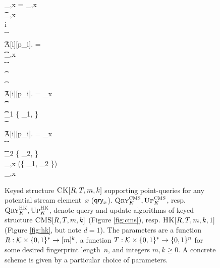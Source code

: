 \begin{figure}[htp]
{\begin{pcvstack}[boxed,center,space=0.5em]
\begin{pchstack}
\begin{pcvstack}[space=0.45em]
{						\pcif \cnt_{,x} =  \cnt_{,x}\label{line:UB=LB:start}\\
						\t \pcreturn \cnt_{,x} \label{line:UB=LB:finish}\\
						\pcfor i \in [k] \label{line:ck:startoverestdjust}\\
						\t {}\\
						\t \pcif A[i][p_i]. = \star\\
						\t \t \cnt_{,x} \\
						\t \t {} \label{line:ck:est0}\\
						\t {}\\
						\t {}\\
						\t \pcelse \pcif A[i][p_i]. \not= \fp_x\\
						\t \t \Theta \gets {}\\
						\t \t \Theta_1 {\gets} {\min}\left\{ \Theta_1, \Theta \right\}\\
						\t {}\\
						\t \pcelse \pcif A[i][p_i]. = \fp_x\\
						\t \t \Theta \gets {}\\
						\t \t \Theta_2 {\gets} 
						{\min}\left\{ 
						\Theta_2, \Theta\right\}\\
						\cnt_{,x} {\gets} \floor(\min\left\{ \Theta_1, \Theta_2 \right\}) \label{line:ck:finaloverest}\\
						\pcreturn \cnt_{,x}
					}
				\end{pcvstack}
			\end{pchstack}	
		\end{pcvstack}
	}
	\caption{Keyed structure $\textnormal{\textsc{CK}}[R,T,m,k]$ supporting point-queries for any potential stream element~$x$ ($\mathsf{qry}_x$).
		$\textnormal{\textsc{Qry}}^{\textnormal{\textsc{CMS}}}_{K}, \textnormal{\textsc{Up}}^{\textnormal{\textsc{CMS}}}_{K}$, resp. $\textnormal{\textsc{Qry}}^{\textnormal{\textsc{HK}}}_{K},  \textnormal{\textsc{Up}}^{\textnormal{\textsc{HK}}}_{K}$, denote query and update algorithms of keyed structure $\textnormal{\textsc{CMS}}[R,T,m,k]$ (Figure \ref{fig:cms}), resp. $\textnormal{\textsc{HK}}[R,T,m,k,1]$ (Figure \ref{fig:hk}, but note $d=1$). 
		The parameters are a function $R: \mathcal{K}\times\{0,1\}^* \to [m]^k$, a function $T: \mathcal{K}\times\{0,1\}^* \to \{0,1\}^n$ for some desired fingerprint length~$n$, and integers $m,k \geq 0$. A concrete scheme is given by a particular choice of parameters.}
	\label{fig:ck}
\end{figure}


